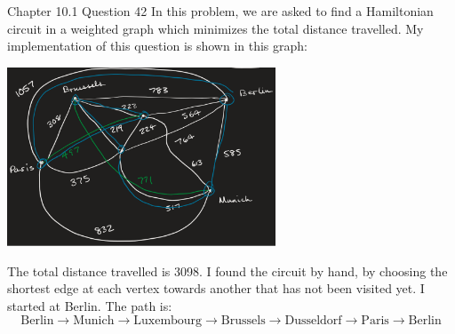 \documentclass[12pt]{article}
\begin{document}
  \begin{problem}{Chapter 10.1 Question 42}
    In this problem, we are asked to find a Hamiltonian circuit in a weighted graph which minimizes the total
    distance travelled. My implementation of this question is shown in this graph:
    \begin{center}
      \includegraphics[width=8cm]{cities.png}
    \end{center}
    The total distance travelled is 3098. I found the circuit by hand, by choosing the shortest edge at each
    vertex towards another that has not been visited yet. I started at Berlin. The path is:
    \begin{equation*}
      \text{Berlin} \rightarrow \text{Munich} \rightarrow \text{Luxembourg} \rightarrow \text{Brussels} \rightarrow \text{Dusseldorf} \rightarrow \text{Paris} \rightarrow \text{Berlin}
    \end{equation*}
  \end{problem}
\end{document}
